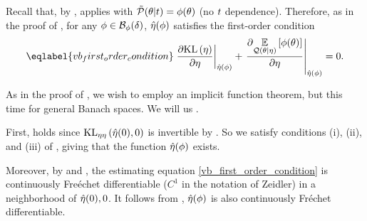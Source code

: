 
%
Recall that, by , 
applies with $\tilde{\mathcal{P}}(\theta \vert t) = \phi(\theta)$ (no $t$ dependence).
Therefore, as in the proof of , for any $\phi \in \mathcal{B}_\phi(\delta)$, $\hat\eta(\phi)$ satisfies the first-order condition
%
\begin{align}\eqlabel{vb_first_order_condition}
%
\fracat{\partial \KL{\eta}}{ \partial \eta}{\etaopt(\phi)} +
\fracat{\partial
    \expect{\q(\theta \vert \eta)}{\phi(\theta)}}
    {\partial \eta}
    {\etaopt(\phi)}
={} 0.
%
\end{align}

As in the proof of , we wish to employ an implicit
function theorem, but this time for general Banach spaces.  We will
us \citet[Theorem 4.B]{zeidler:2013:functional}.

First, \citet[Chapter 4 Condition 21b]{zeidler:2013:functional} holds since
$\mathrm{KL}_{\eta\eta}\left(\hat\eta(0), 0\right)$ is invertible by
.   So we satisfy conditions (i), (ii), and
(iii) of \citet[Theorem 4.B(c)]{zeidler:2013:functional}, giving that the
function $\hat\eta(\phi)$ exists.

Moreover, by  and
, the estimating equation
\eqref{vb_first_order_condition} is continuously Fre{\'e}chet differentiable
($C^1$ in the notation of Zeidler) in a neighborhood of $\hat\eta(0), 0$.
It follows from \citet[Theorem 4.B(d)]{zeidler:2013:functional}, $\hat\eta(\phi)$
is also continuously Fr{\'e}chet differentiable.

%





